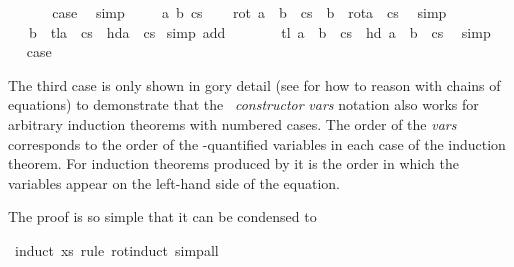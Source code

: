 \begin{isabellebody}
\isamarkupfalse%
\isanewline
\ \ \isamarkupfalse%
\ {}\ \isamarkupfalse%
\ {\isacharquery}case\ \isamarkupfalse%
\ simp\isanewline
{}\isamarkupfalse%
\isanewline
\ \ \isamarkupfalse%
\ {\isacharparenleft}{}\ a\ b\ cs{\isacharparenright}\isanewline
\ \ \isamarkupfalse%
\ {\isachardoublequoteopen}rot\ {\isacharparenleft}a\ {\isacharhash}\ b\ {\isacharhash}\ cs{\isacharparenright}\ {\isacharequal}\ b\ {\isacharhash}\ rot{\isacharparenleft}a\ {\isacharhash}\ cs{\isacharparenright}{\isachardoublequoteclose}\ \isamarkupfalse%
\ simp\isanewline
\ \ \isamarkupfalse%
\ \isamarkupfalse%
\ {\isachardoublequoteopen}{\isasymdots}\ {\isacharequal}\ b\ {\isacharhash}\ tl{\isacharparenleft}a\ {\isacharhash}\ cs{\isacharparenright}\ {\isacharat}\ {\isacharbrackleft}hd{\isacharparenleft}a\ {\isacharhash}\ cs{\isacharparenright}{\isacharbrackright}{\isachardoublequoteclose}\ \isamarkupfalse%
{\isacharparenleft}simp\ add{\isacharcolon}{}{\isacharparenright}\isanewline
\ \ \isamarkupfalse%
\ \isamarkupfalse%
\ {\isachardoublequoteopen}{\isasymdots}\ {\isacharequal}\ tl\ {\isacharparenleft}a\ {\isacharhash}\ b\ {\isacharhash}\ cs{\isacharparenright}\ {\isacharat}\ {\isacharbrackleft}hd\ {\isacharparenleft}a\ {\isacharhash}\ b\ {\isacharhash}\ cs{\isacharparenright}{\isacharbrackright}{\isachardoublequoteclose}\ \isamarkupfalse%
\ simp\isanewline
\ \ \isamarkupfalse%
\ \isamarkupfalse%
\ {\isacharquery}case\ \isacommand{{\isachardot}}\isamarkupfalse%
\isanewline
{}\isamarkupfalse%
%
\endisatagproof
{\isafoldproof}%
%
\isadelimproof
%
\endisadelimproof
%
\begin{isamarkuptext}%
\noindent
The third case is only shown in gory detail (see \cite{BauerW-TPHOLs01}
for how to reason with chains of equations) to demonstrate that the
~\isa{(}\emph{constructor} \emph{vars}\isa{)} notation also
works for arbitrary induction theorems with numbered cases. The order
of the \emph{vars} corresponds to the order of the
\isa{{\isasymAnd}}-quantified variables in each case of the induction
theorem. For induction theorems produced by  it is
the order in which the variables appear on the left-hand side of the
equation.

The proof is so simple that it can be condensed to%
\end{isamarkuptext}%
\isamarkuptrue%
%
\isadelimproof
%
\endisadelimproof
%
\isatagproof
{}\isamarkupfalse%
\ {\isacharparenleft}induct\ xs\ rule{\isacharcolon}\ rot{\isachardot}induct{\isacharparenright}\ simp{\isacharunderscore}all\isanewline
%
\endisatagproof
{\isafoldproof}%
%
\isadelimproof
%
\endisadelimproof
%
\isadelimtheory
%
\endisadelimtheory
%
\isatagtheory
%
\endisatagtheory
{\isafoldtheory}%
%
\isadelimtheory
%
\endisadelimtheory
\end{isabellebody}%
